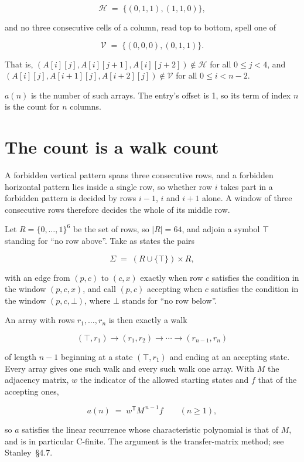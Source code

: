 \documentclass[11pt]{article}
\theoremstyle{definition}
\begin{document}
\[\mathcal{H} \;=\; \{(0,1,1), (1,1,0)\},\]

and no three consecutive cells of a column, read top to bottom, spell one of

\[\mathcal{V} \;=\; \{(0,0,0), (0,1,1)\}.\]

That is, $(A[i][j],A[i][j{+}1],A[i][j{+}2]) \notin \mathcal{H}$ for all $0 \le j < 4$, and $(A[i][j],A[i{+}1][j],A[i{+}2][j]) \notin \mathcal{V}$ for all $0 \le i < n-2$.

$a(n)$ is the number of such arrays. The entry's offset is 1, so its term of index $n$ is the count for $n$ columns.

\section{The count is a walk count}

A forbidden vertical pattern spans three consecutive rows, and a forbidden horizontal pattern lies inside a single row, so whether row $i$ takes part in a forbidden pattern is decided by rows $i-1$, $i$ and $i+1$ alone. A window of three consecutive rows therefore decides the whole of its middle row.

Let $R = \{0,\dots,1\}^{6}$ be the set of rows, so $|R| = 64$, and adjoin a symbol $\top$ standing for ``no row above''. Take as states the pairs

\[\Sigma \;=\; (R \cup \{\top\}) \times R,\]

with an edge from $(p,c)$ to $(c,x)$ exactly when row $c$ satisfies the condition in the window $(p,c,x)$, and call $(p,c)$ accepting when $c$ satisfies the condition in the window $(p,c,\bot)$, where $\bot$ stands for ``no row below''.

An array with rows $r_1,\dots,r_n$ is then exactly a walk

\[(\top,r_1) \to (r_1,r_2) \to \cdots \to (r_{n-1},r_n)\]

of length $n-1$ beginning at a state $(\top,r_1)$ and ending at an accepting state. Every array gives one such walk and every such walk one array. With $M$ the adjacency matrix, $w$ the indicator of the allowed starting states and $f$ that of the accepting ones,

\[a(n) \;=\; w^{\mathsf T} M^{\,n-1} f \qquad (n \ge 1),\]

so $a$ satisfies the linear recurrence whose characteristic polynomial is that of $M$, and is in particular C-finite. The argument is the transfer-matrix method; see Stanley~\S4.7.
\end{document}

